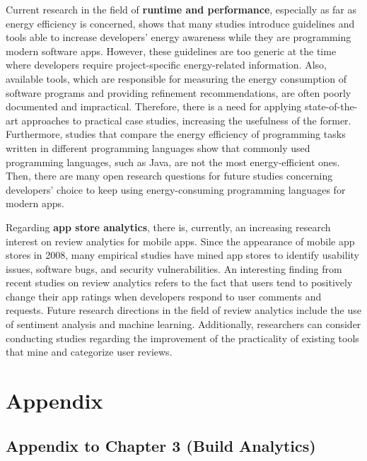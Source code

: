 \documentclass[]{book}
\begin{document}
Current research in the field of \textbf{runtime and performance},
especially as far as energy efficiency is concerned, shows that many
studies introduce guidelines and tools able to increase developers'
energy awareness while they are programming modern software apps.
However, these guidelines are too generic at the time where developers
require project-specific energy-related information. Also, available
tools, which are responsible for measuring the energy consumption of
software programs and providing refinement recommendations, are often
poorly documented and impractical. Therefore, there is a need for
applying state-of-the-art approaches to practical case studies,
increasing the usefulness of the former. Furthermore, studies that
compare the energy efficiency of programming tasks written in different
programming languages show that commonly used programming languages,
such as Java, are not the most energy-efficient ones. Then, there are
many open research questions for future studies concerning developers'
choice to keep using energy-consuming programming languages for modern
apps.

Regarding \textbf{app store analytics}, there is, currently, an
increasing research interest on review analytics for mobile apps. Since
the appearance of mobile app stores in 2008, many empirical studies have
mined app stores to identify usability issues, software bugs, and
security vulnerabilities. An interesting finding from recent studies on
review analytics refers to the fact that users tend to positively change
their app ratings when developers respond to user comments and requests.
Future research directions in the field of review analytics include the
use of sentiment analysis and machine learning. Additionally,
researchers can consider conducting studies regarding the improvement of
the practicality of existing tools that mine and categorize user
reviews.

\appendix


\hypertarget{appendix}{\chapter*{Appendix}\label{appendix}}

\section{Appendix to Chapter 3 (Build
Analytics)}\label{appendix-to-chapter-3-build-analytics}
\end{document}
